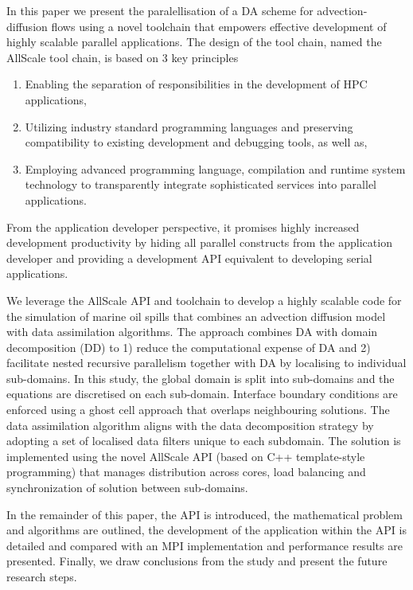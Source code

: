 \documentclass[acmsmall,review,anonymous]{acmart}\settopmatter{printfolios=true,printccs=false,printacmref=false}
\begin{document}
In this paper we present the paralellisation of a DA scheme for advection-diffusion flows using a novel toolchain that empowers effective development of highly scalable parallel applications. The design of the tool chain, named the AllScale tool chain, is based on 3 key principles
\begin{enumerate}
\item Enabling the separation of responsibilities in the development of HPC applications,
\item Utilizing industry standard programming languages and preserving compatibility to existing development and debugging tools, as well as,
\item Employing advanced programming language, compilation and runtime system technology to transparently integrate sophisticated services into parallel applications.
\end{enumerate} 
From the application developer perspective, it promises highly increased development productivity by hiding all parallel constructs from the application developer and providing a development API equivalent to developing serial applications.

We leverage the AllScale API and toolchain to develop a highly scalable code for the simulation of marine oil spills that combines an advection diffusion model with data assimilation algorithms. The approach combines DA with domain decomposition (DD) to 1) reduce the computational expense of DA and 2) facilitate nested recursive parallelism together with DA by localising to individual sub-domains. 
In this study, the global domain is split into sub-domains and the equations are discretised on each sub-domain. Interface boundary conditions are enforced using a ghost cell approach that overlaps neighbouring solutions. The data assimilation algorithm aligns with the data decomposition strategy by adopting a set of localised data filters unique to each subdomain. The solution is implemented using the novel AllScale API (based on C++ template-style programming) that manages distribution across cores, load balancing and synchronization of solution between sub-domains. 

In the remainder of this paper, the API is introduced, the mathematical problem and algorithms are outlined, the development of the application within the API is detailed and compared with an MPI implementation and performance results are presented. Finally, we draw conclusions from the study and present the future research steps.
\end{document}
